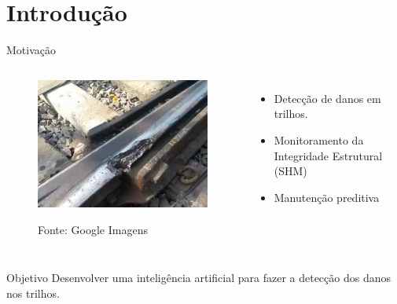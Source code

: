 \section{Introdução}

\begin{frame}{Motivação}
%
\begin{columns}
%
\begin{figure}
    \centering
    \includegraphics[width=\columnwidth]{figures/dano_trilho.png}
    
    {\footnotesize Fonte: Google Imagens}
\end{figure}
%
\begin{itemize}
    \item Detecção de danos em trilhos.
    \item Monitoramento da Integridade Estrutural (SHM)
    \item Manutenção preditiva
\end{itemize}
\end{columns}
\begin{block}{Objetivo}
    Desenvolver uma inteligência artificial para fazer a detecção dos danos nos trilhos.
\end{block}
\end{frame}

